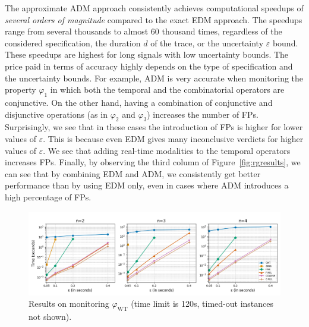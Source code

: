 The approximate ADM approach consistently achieves computational speedups of \emph{several orders of magnitude} 
compared to the exact EDM approach.
The speedups range from several thousands to almost 60 thousand times, regardless of the considered specification, the duration $d$ of the trace, or the uncertainty $\varepsilon$ bound.
These speedups are highest for long signals with low uncertainty bounds.
The price paid in terms of accuracy highly depends on the type of specification and the uncertainty bounds.
For example, ADM is very accurate when monitoring the property $\varphi_1$ in which both the temporal and the combinatorial operators are conjunctive.
On the other hand, having a combination of conjunctive and disjunctive operations (as in $\varphi_{2}$ and $\varphi_{3}$) increases the number of FPs.
Surprisingly, we see that in these cases the introduction of FPs is higher for lower values of $\varepsilon$.
This is because even EDM gives many inconclusive verdicts for higher values of $\varepsilon$.
We see that adding real-time modalities to the temporal operators increases FPs.
Finally, by observing the third column of Figure~\ref{fig:rgresults}, we can see that by combining EDM and ADM, we consistently get better performance than by using EDM only, even in cases where ADM introduces a high percentage of FPs.



\begin{figure}[t]
	\begin{center}
		\includegraphics[width=\linewidth]{wtlin.png}
		\caption{Results on monitoring $\varphi_{\text{WT}}$ (time limit is 120s, timed-out instances not shown).}
		\vspace{3mm}
	\end{center}
	\vspace{-1em}
\end{figure}

